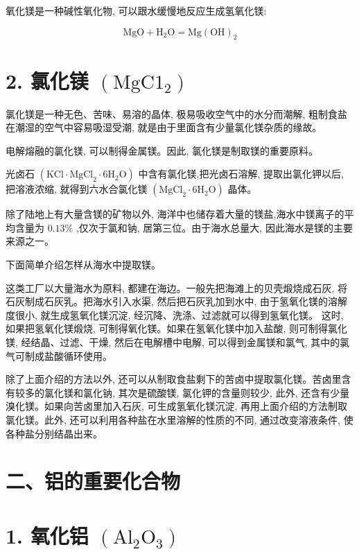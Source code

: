 \documentclass[10pt]{article}
\begin{document}
氧化镁是一种碱性氧化物, 可以跟水缓慢地反应生成氢氧化镁:

\[
\mathrm{{MgO}} + {\mathrm{H}}_{2}\mathrm{O} = \mathrm{{Mg}}{\left( \mathrm{{OH}}\right) }_{2}
\]

\section*{2. 氯化镁 \(\left( {\mathrm{{MgC}}{1}_{2}}\right)\)}

氯化镁是一种无色、苦味、易溶的晶体, 极易吸收空气中的水分而潮解, 粗制食盐在潮湿的空气中容易吸湿受潮, 就是由于里面含有少量氯化镁杂质的缘故。

电解熔融的氯化镁, 可以制得金属镁。因此, 氯化镁是制取镁的重要原料。

光卤石 \(\left( {\mathrm{{KCl}} \cdot {\mathrm{{MgCl}}}_{2} \cdot 6{\mathrm{H}}_{2}\mathrm{O}}\right)\) 中含有氯化镁,把光卤石溶解, 提取出氯化钾以后, 把溶液浓缩, 就得到六水合氯化镁 \(\left( {{\mathrm{{MgCl}}}_{2} \cdot 6{\mathrm{H}}_{2}\mathrm{O}}\right)\) 晶体。

除了陆地上有大量含镁的矿物以外, 海洋中也储存着大量的镁盐,海水中镁离子的平均含量为 \({0.13}\%\) ,仅次于氯和钠, 居第三位。由于海水总量大, 因此海水是镁的主要来源之一。

下面简单介绍怎样从海水中提取镁。

这类工厂以大量海水为原料, 都建在海边。一般先把海滩上的贝壳煅烧成石灰, 将石灰制成石灰乳。把海水引入水渠, 然后把石灰乳加到水中, 由于氢氧化镁的溶解度很小, 就生成氢氧化镁沉淀, 经沉降、洗涤、过滤就可以得到氢氧化镁。 这时, 如果把氢氧化镁煅烧, 可制得氧化镁。如果在氢氧化镁中加入盐酸, 则可制得氯化镁, 经结晶、过滤、干燥, 然后在电解槽中电解, 可以得到金属镁和氯气, 其中的氯气可制成盐酸循环使用。

除了上面介绍的方法以外, 还可以从制取食盐剩下的苦卤中提取氯化镁。苦卤里含有较多的氯化镁和氯化钠, 其次是硫酸镁, 氯化钾的含量则较少, 此外, 还含有少量溴化镁。如果向苦卤里加入石灰, 可生成氢氧化镁沉淀, 再用上面介绍的方法制取氯化镁。此外, 还可以利用各种盐在水里溶解的性质的不同, 通过改变溶液条件, 使各种盐分别结晶出来。

\section*{二、铝的重要化合物}

\section*{1. 氧化铝 \(\left( {{\mathrm{{Al}}}_{2}{\mathrm{O}}_{3}}\right)\)}
\end{document}
